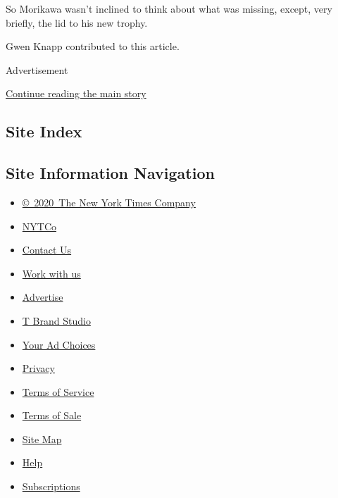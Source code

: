 So Morikawa wasn't inclined to think about what was missing, except,
very briefly, the lid to his new trophy.

Gwen Knapp contributed to this article.

Advertisement

\protect\hyperlink{after-bottom}{Continue reading the main story}

\hypertarget{site-index}{%
\subsection{Site Index}\label{site-index}}

\hypertarget{site-information-navigation}{%
\subsection{Site Information
Navigation}\label{site-information-navigation}}

\begin{itemize}
\tightlist
\item
  \href{https://help.nytimes3xbfgragh.onion/hc/en-us/articles/115014792127-Copyright-notice}{©~2020~The
  New York Times Company}
\end{itemize}

\begin{itemize}
\tightlist
\item
  \href{https://www.nytco.com/}{NYTCo}
\item
  \href{https://help.nytimes3xbfgragh.onion/hc/en-us/articles/115015385887-Contact-Us}{Contact
  Us}
\item
  \href{https://www.nytco.com/careers/}{Work with us}
\item
  \href{https://nytmediakit.com/}{Advertise}
\item
  \href{http://www.tbrandstudio.com/}{T Brand Studio}
\item
  \href{https://www.nytimes3xbfgragh.onion/privacy/cookie-policy\#how-do-i-manage-trackers}{Your
  Ad Choices}
\item
  \href{https://www.nytimes3xbfgragh.onion/privacy}{Privacy}
\item
  \href{https://help.nytimes3xbfgragh.onion/hc/en-us/articles/115014893428-Terms-of-service}{Terms
  of Service}
\item
  \href{https://help.nytimes3xbfgragh.onion/hc/en-us/articles/115014893968-Terms-of-sale}{Terms
  of Sale}
\item
  \href{https://spiderbites.nytimes3xbfgragh.onion}{Site Map}
\item
  \href{https://help.nytimes3xbfgragh.onion/hc/en-us}{Help}
\item
  \href{https://www.nytimes3xbfgragh.onion/subscription?campaignId=37WXW}{Subscriptions}
\end{itemize}
